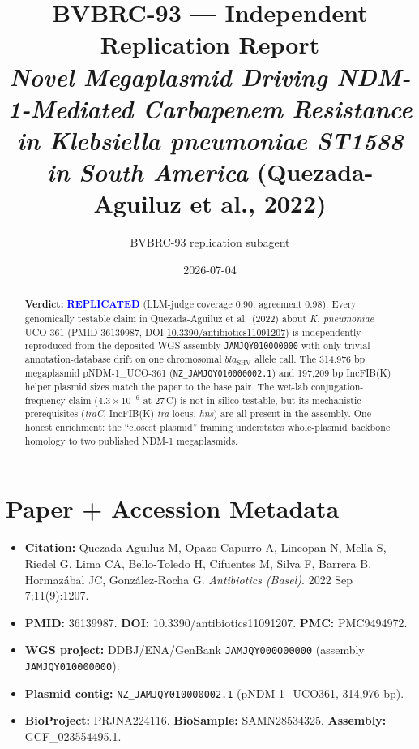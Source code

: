 \documentclass[11pt,letterpaper]{article}
\title{BVBRC-93 --- Independent Replication Report\\
\large \textit{Novel Megaplasmid Driving NDM-1-Mediated Carbapenem Resistance in Klebsiella pneumoniae ST1588 in South America} (Quezada-Aguiluz et al., 2022)}
\author{BVBRC-93 replication subagent}
\date{2026-07-04}
\begin{document}
\maketitle

\begin{abstract}
\noindent\textbf{Verdict:} \textcolor{blue}{\textbf{REPLICATED}} (LLM-judge coverage 0.90, agreement 0.98).
Every genomically testable claim in Quezada-Aguiluz et al.\ (2022) about \textit{K. pneumoniae} UCO-361
(PMID 36139987, DOI \href{https://doi.org/10.3390/antibiotics11091207}{10.3390/antibiotics11091207})
is independently reproduced from the deposited WGS assembly \texttt{JAMJQY010000000} with only trivial
annotation-database drift on one chromosomal $bla_{\mathrm{SHV}}$ allele call. The 314{,}976 bp
megaplasmid pNDM-1\_UCO-361 (\texttt{NZ\_JAMJQY010000002.1}) and 197{,}209 bp IncFIB(K) helper plasmid
sizes match the paper to the base pair. The wet-lab conjugation-frequency claim ($4.3\times10^{-6}$
at 27\,\textdegree C) is not in-silico testable, but its mechanistic prerequisites (\textit{traC},
IncFIB(K) \textit{tra} locus, \textit{hns}) are all present in the assembly. One honest enrichment:
the ``closest plasmid'' framing understates whole-plasmid backbone homology to two published NDM-1
megaplasmids.
\end{abstract}

\section{Paper + Accession Metadata}
\begin{itemize}[leftmargin=1.5em]
  \item \textbf{Citation:} Quezada-Aguiluz M, Opazo-Capurro A, Lincopan N, Mella S, Riedel G, Lima CA,
        Bello-Toledo H, Cifuentes M, Silva F, Barrera B, Hormaz\'{a}bal JC, Gonz\'{a}lez-Rocha G.
        \textit{Antibiotics (Basel)}. 2022 Sep 7;11(9):1207.
  \item \textbf{PMID:} 36139987. \textbf{DOI:} 10.3390/antibiotics11091207. \textbf{PMC:} PMC9494972.
  \item \textbf{WGS project:} DDBJ/ENA/GenBank \texttt{JAMJQY000000000} (assembly \texttt{JAMJQY010000000}).
  \item \textbf{Plasmid contig:} \texttt{NZ\_JAMJQY010000002.1} (pNDM-1\_UCO361, 314{,}976 bp).
  \item \textbf{BioProject:} PRJNA224116. \textbf{BioSample:} SAMN28534325. \textbf{Assembly:} GCF\_023554495.1.
\end{itemize}
\end{document}
